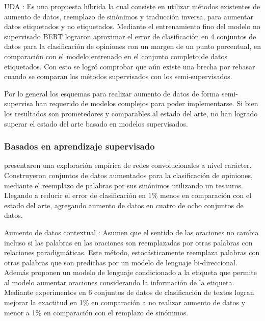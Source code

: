 UDA \citep{xie2019unsupervised}: Es una propuesta híbrida la cual consiste en utilizar métodos existentes de aumento de datos, reemplazo de sinónimos y traducción inversa, para aumentar datos etiquetados y no etiquetados. Mediante el entrenamiento fino del modelo no supervisado BERT lograron aproximar el error de clasificación en 4 conjuntos de datos para la clasificación de opiniones con un margen de un punto porcentual, en comparación con el modelo entrenado en el conjunto completo de datos etiquetados. Con esto se logró comprobar que aún existe una brecha por rebasar cuando se comparan los métodos supervisados con los semi-supervisados.

Por lo general los esquemas para realizar aumento de datos de forma semi-supervisa han requerido de modelos complejos para poder implementarse. Si bien los resultados son prometedores y comparables al estado del arte, no han logrado superar el estado del arte basado en modelos supervisados.

\subsubsection{Basados en aprendizaje supervisado}

\citep{zhang2015character} presentaron una exploración empírica de redes convolucionales a nivel carácter. Construyeron conjuntos de datos aumentados para la clasificación de opiniones, mediante el reemplazo de palabras por sus sinónimos utilizando un tesauros. Llegando a reducir el error de clasificación en 1\% menos en comparación con el estado del arte, agregando aumento de datos en cuatro de ocho conjuntos de datos.


Aumento de datos contextual \citep{kobayashi2018contextual}: Asumen que el sentido de las oraciones no cambia incluso si las palabras en las oraciones son reemplazadas por otras palabras con relaciones paradigmáticas. Este método, estocásticamente reemplaza palabras con otras palabras que son predichas por un modelo de lenguaje bi-direccional. Además proponen un modelo de lenguaje condicionado a la etiqueta que permite al modelo aumentar oraciones considerando la información de la etiqueta. Mediante experimentos en 6 conjuntos de datos de clasificación de textos logran mejorar la exactitud en 1\% en comparación a no realizar aumento de datos y menor a 1\% en comparación con el remplazo de sinónimos.


